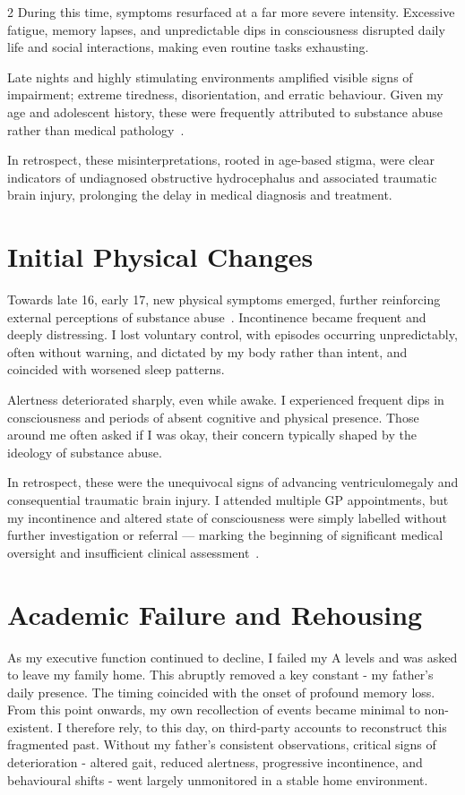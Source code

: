 \documentclass{article}
\begin{document}
\begin{multicols}{2}
During this time, symptoms resurfaced at a far more severe intensity. Excessive fatigue, memory lapses, and unpredictable dips in consciousness disrupted daily life and social interactions, making even routine tasks exhausting.

Late nights and highly stimulating environments amplified visible signs of impairment; extreme tiredness, disorientation, and erratic behaviour. Given my age and adolescent history, these were frequently attributed to substance abuse rather than medical pathology~\cite{yang2017,hammarlund2018,zwick2020,lankenau2012}.

In retrospect, these misinterpretations, rooted in age-based stigma, were clear indicators of undiagnosed obstructive hydrocephalus and associated traumatic brain injury, prolonging the delay in medical diagnosis and treatment.

\section*{Initial Physical Changes}
Towards late 16, early 17, new physical symptoms emerged, further reinforcing external perceptions of substance abuse~\cite{yang2017,hammarlund2018,zwick2020,mcginty2020,bielenberg2021,lankenau2012}. Incontinence became frequent and deeply distressing. I lost voluntary control, with episodes occurring unpredictably, often without warning, and dictated by my body rather than intent, and coincided with worsened sleep patterns.

Alertness deteriorated sharply, even while awake. I experienced frequent dips in consciousness and periods of absent cognitive and physical presence. Those around me often asked if I was okay, their concern typically shaped by the ideology of substance abuse.

In retrospect, these were the unequivocal signs of advancing ventriculomegaly and consequential traumatic brain injury. I attended multiple GP appointments, but my incontinence and altered state of consciousness were simply labelled without further investigation or referral — marking the beginning of significant medical oversight and insufficient clinical assessment~\cite{jones2008,shefer2014,ali2021}.

\section*{Academic Failure and Rehousing}
As my executive function continued to decline, I failed my A levels and was asked to leave my family home. This abruptly removed a key constant - my father’s daily presence. The timing coincided with the onset of profound memory loss. From this point onwards, my own recollection of events became minimal to non-existent. I therefore rely, to this day, on third-party accounts to reconstruct this fragmented past. Without my father’s consistent observations, critical signs of deterioration - altered gait, reduced alertness, progressive incontinence, and behavioural shifts - went largely unmonitored in a stable home environment.


\end{multicols}
\end{document}

